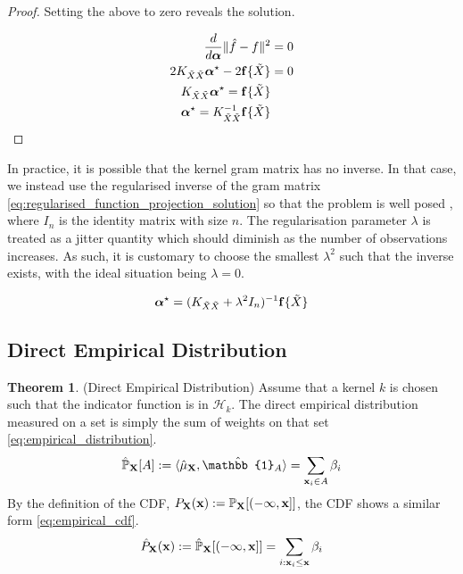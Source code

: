 \documentclass[twoside]{article} \usepackage{aistats2017}
\theoremstyle{definition}
\theoremstyle{theorem}
\newtheorem{theorem}{Theorem}[section]
\newcommand{\rv}[1]{{#1}}
\newcommand{\ds}[1]{\tilde{#1}}
\newcommand{\inner}[2]{{\langle #1, #2 \rangle}}
\begin{document}
\begin{proof}
			Setting the above to zero reveals the solution.
			
			\begin{align*}
				\frac{d}{d \bm{\alpha}} \Vert \hat{f} - f \Vert^{2} &= 0 \\
				2 K_{\ds{X} \ds{X}}  \bm{\alpha}^{\star} - 2 \bvec{f}\{\ds{X}\} &= 0 \\
				K_{\ds{X} \ds{X}}  \bm{\alpha}^{\star} = \bvec{f}\{\ds{X}\} \\
				\bm{\alpha}^{\star} = K_{\ds{X} \ds{X}}^{-1} \bvec{f}\{\ds{X}\}
			\end{align*}
		\end{proof}
		
		In practice, it is possible that the kernel gram matrix has no inverse. In that case, we instead use the regularised inverse of the gram matrix \eqref{eq:regularised_function_projection_solution} so that the problem is well posed \citep{muandet2016kernel}, where $I_{n}$ is the identity matrix with size $n$. The regularisation parameter $\lambda$ is treated as a jitter quantity which should diminish as the number of observations increases. As such, it is customary to choose the smallest $\lambda^{2}$ such that the inverse exists, with the ideal situation being $\lambda = 0$. 
		
		\begin{equation}
			\bm{\alpha}^{\star} = (K_{\ds{X} \ds{X}} + \lambda^{2} I_{n})^{-1} \bvec{f}\{\ds{X}\}
		\label{eq:regularised_function_projection_solution}
		\end{equation}

	\subsection{Direct Empirical Distribution}
	\label{sec:derivations:direct_empirical_distribution}

		\begin{theorem} \label{thm:empirical_distribution_and_cdf}
			(Direct Empirical Distribution)
			Assume that a kernel $k$ is chosen such that the indicator function is in $\mathcal{H}_{k}$. The direct empirical distribution measured on a set is simply the sum of weights on that set \eqref{eq:empirical_distribution}.
			\begin{equation}
				\hat{\mathbb{P}}_{\bvec{\rv{X}}}[A] := \inner{\hat{\mu}_{\bvec{\rv{X}}}}{ \hat{\mathbb{1}}_{A}} = \sum_{\bvec{x}_{i} \in A} \beta_{i}
			\label{eq:empirical_distribution}
			\end{equation}
			By the definition of the CDF, $P_{\bvec{\rv{X}}}(\bvec{x}) := \mathbb{P}_{\bvec{\rv{X}}}[(-\bvec{\infty}, \bvec{x}]]$, the CDF shows a similar form \eqref{eq:empirical_cdf}.
			\begin{equation}
				\hat{P}_{\bvec{\rv{X}}}(\bvec{x}) := \hat{\mathbb{P}}_{\bvec{\rv{X}}}[(-\bvec{\infty}, \bvec{x}]] = \sum_{i : \bvec{x}_{i} \leq \bvec{x}} \beta_{i}
			\label{eq:empirical_cdf}
			\end{equation}
		\end{theorem}
			
\end{document}
